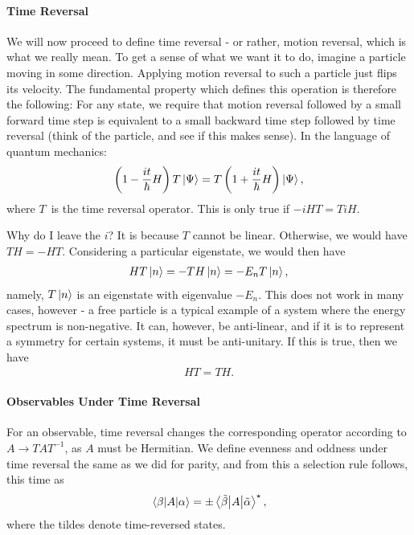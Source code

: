 \paragraph{Time Reversal}
We will now proceed to define time reversal - or rather, motion reversal, which is what we really mean. To get a sense of what we want it to do, imagine a particle moving in some direction. Applying motion reversal to such a particle just flips its velocity. The fundamental property which defines this operation is therefore the following: For any state, we require that motion reversal followed by a small forward time step is equivalent to a small backward time step followed by time reversal (think of the particle, and see if this makes sense). In the language of quantum mechanics:
\begin{align*}
	\left(1 - \frac{it}{\hbar}H\right)T\ket{\Psi} = T\left(1 + \frac{it}{\hbar}H\right)\ket{\Psi},
\end{align*}
where $T$ is the time reversal operator. This is only true if $-iHT = TiH$.

Why do I leave the $i$? It is because $T$ cannot be linear. Otherwise, we would have $TH = -HT$. Considering a particular eigenstate, we would then have
\begin{align*}
	HT\ket{n} = -TH\ket{n} = -E_{n}T\ket{n},
\end{align*}
namely, $T\ket{n}$ is an eigenstate with eigenvalue $-E_{n}$. This does not work in many cases, however - a free particle is a typical example of a system where the energy spectrum is non-negative. It can, however, be anti-linear, and if it is to represent a symmetry for certain systems, it must be anti-unitary. If this is true, then we have
\begin{align*}
	HT = TH.
\end{align*}

\paragraph{Observables Under Time Reversal}
For an observable, time reversal changes the corresponding operator according to $A \to TAT^{-1}$, as $A$ must be Hermitian. We define evenness and oddness under time reversal the same as we did for parity, and from this a selection rule follows, this time as
\begin{align*}
	\mel{\beta}{A}{\alpha} = \pm\mel{\tilde{\beta}}{A}{\tilde{\alpha}}^{\star},
\end{align*}
where the tildes denote time-reversed states.

